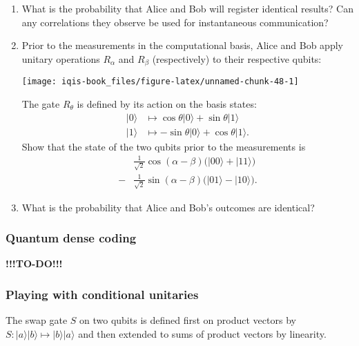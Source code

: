 \documentclass[fleqn]{article}
\begin{document}
\begin{enumerate}
\def\labelenumi{\arabic{enumi}.}
\item
  What is the probability that Alice and Bob will register identical results?
  Can any correlations they observe be used for instantaneous communication?
\item
  Prior to the measurements in the computational basis, Alice and Bob apply unitary operations \(R_\alpha\) and \(R_\beta\) (respectively) to their respective qubits:

  \begin{center}\texttt{[image: iqis-book\_files/figure-latex/unnamed-chunk-48-1]} \end{center}

  The gate \(R_\theta\) is defined by its action on the basis states:
  \[
     \begin{aligned}
       |0\rangle
       &\longmapsto
       \cos\theta|0\rangle + \sin\theta|1\rangle
     \\|1\rangle
       &\longmapsto
       -\sin\theta|0\rangle + \cos\theta|1\rangle.
     \end{aligned}
   \]
  Show that the state of the two qubits prior to the measurements is
  \[
     \begin{aligned}
       &\frac{1}{\sqrt2}\cos(\alpha-\beta)\big( |00\rangle + |11\rangle \big)
     \\- &\frac{1}{\sqrt2}\sin(\alpha-\beta)\big( |01\rangle - |10\rangle \big).
     \end{aligned}
   \]
\item
  What is the probability that Alice and Bob's outcomes are identical?
\end{enumerate}

\hypertarget{quantum-dense-coding}{%
\subsubsection{Quantum dense coding}\label{quantum-dense-coding}}

\textbf{!!!TO-DO!!!}

\hypertarget{playing-with-conditional-unitaries}{%
\subsubsection{Playing with conditional unitaries}\label{playing-with-conditional-unitaries}}

The swap gate \(S\) on two qubits is defined first on product vectors by \(S\colon|a\rangle|b\rangle\mapsto|b\rangle|a\rangle\) and then extended to sums of product vectors by linearity.
\end{document}
